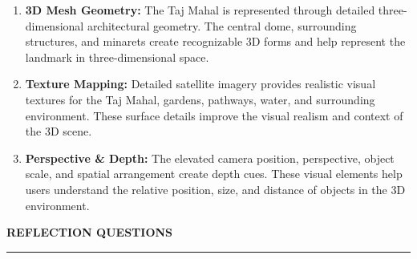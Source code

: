 \documentclass[12pt,a4paper,landscape]{article}
\newcommand{\pagetitle}[1]{

    \begin{center}

        {\color{DarkBlue}
        \fontsize{21}{24}\selectfont
        \bfseries #1}

        \vspace{0.15cm}

        \rule{18.5cm}{0.5pt}

    \end{center}

    \vspace{0.30cm}
}
\begin{document}

\vspace{0.22cm}

\begin{enumerate}[
    label=\textcolor{Red}{\bfseries\arabic*.},
    leftmargin=0.72cm,
    rightmargin=0.25cm,
    itemsep=3pt,
    topsep=0pt,
    parsep=0pt
]

\item
\textbf{3D Mesh Geometry:}
The Taj Mahal is represented through detailed three-dimensional
architectural geometry. The central dome, surrounding structures,
and minarets create recognizable 3D forms and help represent
the landmark in three-dimensional space.

\item
\textbf{Texture Mapping:}
Detailed satellite imagery provides realistic visual textures
for the Taj Mahal, gardens, pathways, water, and surrounding
environment. These surface details improve the visual realism
and context of the 3D scene.

\item
\textbf{Perspective \& Depth:}
The elevated camera position, perspective, object scale, and
spatial arrangement create depth cues. These visual elements
help users understand the relative position, size, and distance
of objects in the 3D environment.

\end{enumerate}



\newpage



\pagetitle{REFLECTION QUESTIONS}


\end{document}
